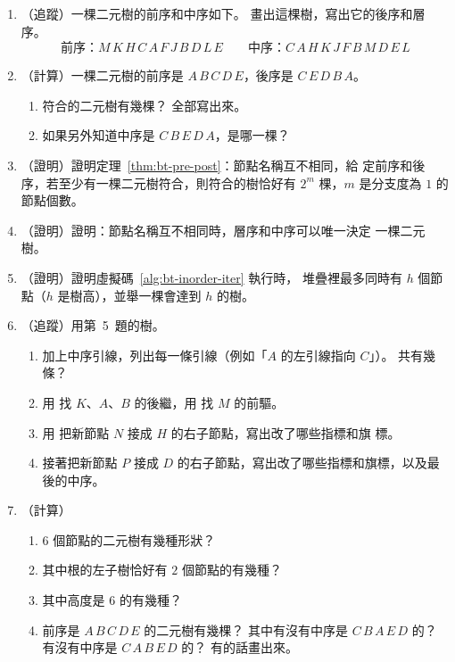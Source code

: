 \begin{enumerate}
\item （追蹤）一棵二元樹的前序和中序如下。 畫出這棵樹，寫出它的後序和層序。
\[
\text{前序：}M\,K\,H\,C\,A\,F\,J\,B\,D\,L\,E \qquad
\text{中序：}C\,A\,H\,K\,J\,F\,B\,M\,D\,E\,L
\]

\item （計算）一棵二元樹的前序是 $A\,B\,C\,D\,E$，後序是 $C\,E\,D\,B\,A$。
\begin{enumerate}
\item 符合的二元樹有幾棵？ 全部寫出來。
\item 如果另外知道中序是 $C\,B\,E\,D\,A$，是哪一棵？
\end{enumerate}

\item \label{q:bt-pre-post}（證明）證明定理~\ref{thm:bt-pre-post}：節點名稱互不相同，給
定前序和後序，若至少有一棵二元樹符合，則符合的樹恰好有 $2^m$ 棵，$m$ 是分支度為 $1$
的節點個數。

\item \label{q:bt-level-in}（證明）證明：節點名稱互不相同時，層序和中序可以唯一決定
一棵二元樹。

\item \label{q:bt-stack-height}（證明）證明虛擬碼~\ref{alg:bt-inorder-iter} 執行時，
堆疊裡最多同時有 $h$ 個節點（$h$ 是樹高），並舉一棵會達到 $h$ 的樹。

\item （追蹤）用第~5~題的樹。
\begin{enumerate}
\item 加上中序引線，列出每一條引線（例如「$A$ 的左引線指向 $C$」）。 共有幾條？
\item 用  找 $K$、$A$、$B$ 的後繼，用  找 $M$ 的前驅。
\item 用  把新節點 $N$ 接成 $H$ 的右子節點，寫出改了哪些指標和旗
標。
\item 接著把新節點 $P$ 接成 $D$ 的右子節點，寫出改了哪些指標和旗標，以及最後的中序。
\end{enumerate}

\item （計算）
\begin{enumerate}
\item $6$ 個節點的二元樹有幾種形狀？
\item 其中根的左子樹恰好有 $2$ 個節點的有幾種？
\item 其中高度是 $6$ 的有幾種？
\item 前序是 $A\,B\,C\,D\,E$ 的二元樹有幾棵？ 其中有沒有中序是 $C\,B\,A\,E\,D$ 的？
有沒有中序是 $C\,A\,B\,E\,D$ 的？ 有的話畫出來。
\end{enumerate}


\end{enumerate}
